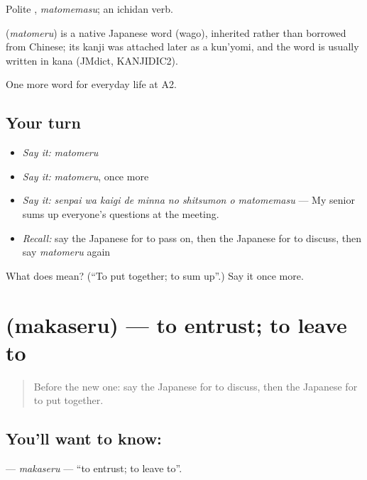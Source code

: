 Polite \textbf{}, \emph{matomemasu}; an ichidan verb.

\begin{cousinweb}
\textbf{} (\emph{matomeru}) is a native Japanese word (wago), inherited rather than borrowed from Chinese; its kanji was attached later as a kun'yomi, and the word is usually written in kana (JMdict, KANJIDIC2).
\end{cousinweb}

\begin{grammarlens}[title={What you've built}]
One more word for everyday life at A2.
\end{grammarlens}

\subsection*{Your turn}
\begin{itemize}
\raggedright
  \item \emph{Say it:} \emph{matomeru}
  \item \emph{Say it:} \emph{matomeru}, once more
  \item \emph{Say it:} \emph{senpai wa kaigi de minna no shitsumon o matomemasu} — My senior sums up everyone's questions at the meeting.
  \item \emph{Recall:} say the Japanese for to pass on, then the Japanese for to discuss, then say \emph{matomeru} again
\end{itemize}

\begin{tcolorbox}[breakable,colback=teal!4,colframe=teal!35!black,title={Before you move on}]
What does  mean? (\textquotedblleft{}To put together; to sum up\textquotedblright{}.) Say it once more.
\end{tcolorbox}
\section[\texorpdfstring{\ja{まかせる} (makaseru)}{まかせる (makaseru)}]{ (makaseru) — to entrust; to leave to}

\label{lesson:JA-C232-makaseru}



\begin{quote}
Before the new one: say the Japanese for to discuss, then the Japanese for to put together.
\end{quote}

\subsection*{You'll want to know: }
\textbf{} — \emph{makaseru} — \textquotedblleft{}to entrust; to leave to\textquotedblright{}.


